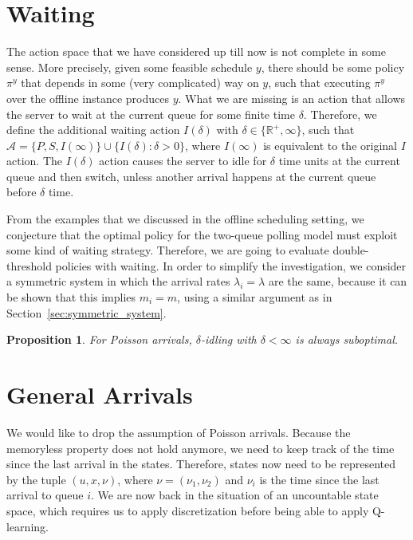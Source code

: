 \documentclass{article}
\theoremstyle{definition}
\theoremstyle{plain}
\newtheorem{proposition}{Proposition}[section]
\begin{document}
\section{Waiting}

The action space that we have considered up till now is not complete in some
sense. More precisely, given some feasible schedule $y$, there should be some
policy $\pi^{y}$ that depends in some (very complicated) way on $y$, such that
executing $\pi^{y}$ over the offline instance produces $y$. What we are missing
is an action that allows the server to wait at the current queue for some finite
time $\delta$. Therefore, we define the additional waiting action $I(\delta)$
with $\delta \in \{ \mathbb{R}^{+}, \infty \}$, such that
$\mathcal{A} = \{ P, S, I(\infty) \} \cup \{ I(\delta) : \delta > 0 \}$, where
$I(\infty)$ is equivalent to the original $I$ action. The $I(\delta)$ action
causes the server to idle for $\delta$ time units at the current queue and then
switch, unless another arrival happens at the current queue before $\delta$
time.

From the examples that we discussed in the offline scheduling setting, we
conjecture that the optimal policy for the two-queue polling model must exploit
some kind of waiting strategy. Therefore, we are going to evaluate
double-threshold policies with waiting. In order to simplify the investigation,
we consider a symmetric system in which the arrival rates $\lambda_{i} = \lambda$ are the
same, because it can be shown that this implies $m_{i} = m$, using a similar
argument as in Section~\ref{sec:symmetric_system}.

\begin{proposition}
  For Poisson arrivals, $\delta$-idling with $\delta < \infty$ is always suboptimal.
\end{proposition}


\section{General Arrivals}

We would like to drop the assumption of Poisson arrivals. Because the memoryless
property does not hold anymore, we need to keep track of the time since the last
arrival in the states. Therefore, states now need to be represented by the tuple
$(u, x, \nu)$, where $\nu = (\nu_{1}, \nu_{2})$ and $\nu_{i}$ is the time since
the last arrival to queue $i$. We are now back in the situation of an
uncountable state space, which requires us to apply discretization before being
able to apply Q-learning.
\end{document}
